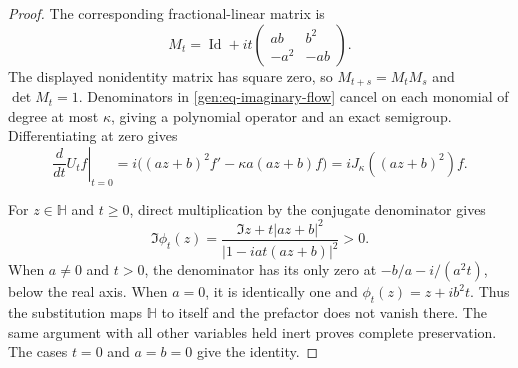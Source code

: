 \documentclass[reqno]{amsart}
\theoremstyle{definition}
\theoremstyle{remark}
\newcommand{\HH}{\mathbb H}
\DeclareMathOperator{\Id}{Id}
\begin{document}
\begin{proof}
The corresponding fractional-linear matrix is
\[
 M_t=\Id+it
 \begin{pmatrix}ab&b^2\\-a^2&-ab\end{pmatrix}.
\]
The displayed nonidentity matrix has square zero, so
\(M_{t+s}=M_tM_s\) and \(\det M_t=1\).
Denominators in \eqref{gen:eq-imaginary-flow} cancel on each
monomial of degree at most \(\kappa\), giving a polynomial
operator and an exact semigroup.
Differentiating at zero gives
\[
 \left.\frac{d}{dt}U_tf\right|_{t=0}
 =i\bigl((az+b)^2f'-\kappa a(az+b)f\bigr)
 =iJ_\kappa((az+b)^2)f.
\]

For \(z\in\HH\) and \(t\geq0\), direct multiplication by the
conjugate denominator gives
\begin{equation}
 \Im\phi_t(z)
 =\frac{\Im z+t|az+b|^2}{|1-iat(az+b)|^2}>0.
 \label{gen:eq-imaginary-height}
\end{equation}
When \(a\neq0\) and \(t>0\), the denominator has its only zero at
\(-b/a-i/(a^2t)\), below the real axis.
When \(a=0\), it is identically one and
\(\phi_t(z)=z+ib^2t\).
Thus the substitution maps \(\HH\) to itself and the prefactor
does not vanish there.
The same argument with all other variables held inert proves
complete preservation.  The cases \(t=0\) and \(a=b=0\) give
the identity.
\end{proof}
\end{document}
